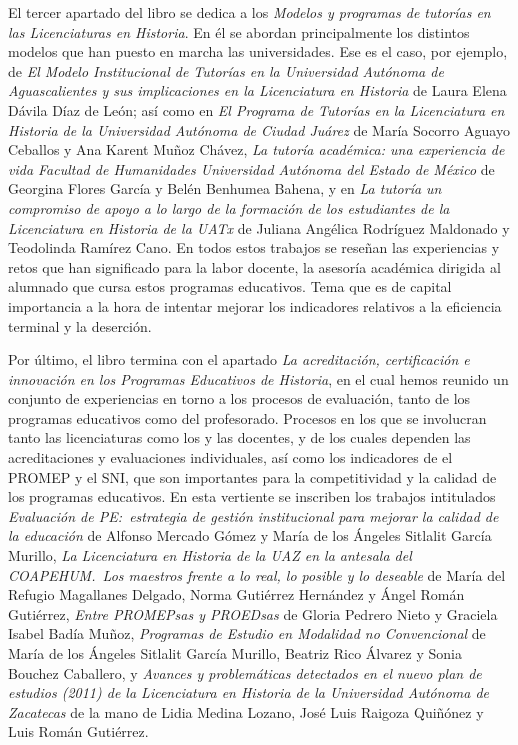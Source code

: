 El tercer apartado del libro se dedica a los
\textit{Modelos y programas de tutorías en las
Licenciaturas en Historia}. En él se abordan
principalmente los distintos modelos que han puesto en marcha las
universidades. Ese es el caso, por ejemplo, de \textit{El Modelo
Institucional de Tutorías en la Universidad Autónoma de Aguascalientes y
sus implicaciones en la Licenciatura en Historia} de
Laura Elena Dávila Díaz de León; así como en 
\textit{El Programa de Tutorías en la Licenciatura en Historia
de la Universidad Autónoma de Ciudad Juárez} de María
Socorro Aguayo Ceballos y Ana Karent Muñoz Chávez, 
\textit{La tutoría académica: una experiencia de vida Facultad
de Humanidades Universidad Autónoma del Estado de México} de Georgina
Flores García y  Belén Benhumea Bahena,
y en \textit{La tutoría un compromiso de apoyo a lo largo de la
formación de los estudiantes de la Licenciatura en Historia de la UATx} de 
Juliana Angélica Rodríguez Maldonado y
Teodolinda Ramírez Cano. En todos estos trabajos se reseñan las
experiencias y retos que han significado para la labor docente, la asesoría
académica dirigida al alumnado que cursa estos programas educativos. Tema que es de capital importancia a la hora de intentar mejorar los indicadores relativos a la eficiencia terminal  y la deserción.

\enlargethispage{1\baselineskip}
Por último, el libro termina con el apartado
\textit{La acreditación, certificación e innovación en
los Programas Educativos de Historia}, en el cual hemos reunido un
conjunto de experiencias en torno a los procesos de evaluación, tanto de los
programas educativos como del profesorado.
Procesos en los que se involucran tanto las licenciaturas como los y las
docentes, y de los cuales dependen las acreditaciones y evaluaciones
individuales, así como los indicadores de el PROMEP y el SNI, que son importantes
para la competitividad y la calidad de los programas educativos. En esta vertiente se inscriben los trabajos intitulados \textit{Evaluación de PE:\
estrategia de gestión institucional para mejorar la calidad de la
educación} de Alfonso Mercado Gómez y
María de los Ángeles Sitlalit García Murillo, \textit{La
Licenciatura en Historia de la UAZ en la antesala del COAPEHUM.\ Los
maestros frente a lo real, lo posible y lo deseable} de
María del Refugio Magallanes Delgado, Norma Gutiérrez
Hernández y  Ángel Román Gutiérrez, \textit{Entre PROMEPsas y
PROEDsas} de Gloria Pedrero Nieto y Graciela Isabel Badía Muñoz,
\textit{Programas de Estudio en Modalidad no Convencional} de
María de los Ángeles Sitlalit García Murillo,
Beatriz Rico Álvarez y Sonia Bouchez
Caballero, y \textit{Avances y problemáticas detectados en el
nuevo plan de estudios (2011) de la Licenciatura en Historia de la
Universidad Autónoma de Zacatecas} de la mano de Lidia Medina Lozano,
José Luis Raigoza Quiñónez y  Luis Román Gutiérrez.


